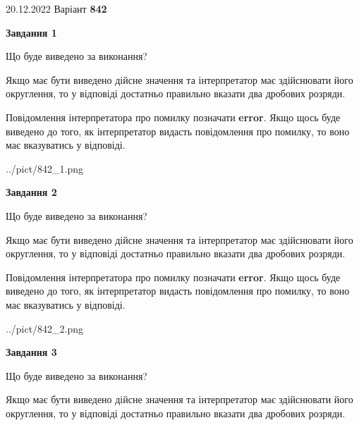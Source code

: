 \documentclass[12pt, ukrainian]{article}
\begin{document}
{20.12.2022 Варіант \No \textbf { 842 }\par}
{
\begin {Large}

{\begin {center}\textbf{Завдання 1}\end {center}}\par
Що буде виведено за виконання? \par

Якщо має бути виведено дійсне значення та інтерпретатор має здійснювати його округлення, 
то у відповіді достатньо правильно вказати два дробових розряди.

Повідомлення інтерпретатора про помилку позначати \textbf{error}.
Якщо щось буде виведено до того, як інтерпретатор видасть повідомлення про помилку, 
то воно має вказуватись у відповіді. \par

\begin{center}
	{../pict/842_1.png}
\end{center}
\newpage

{\begin {center}\textbf{Завдання 2}\end {center}}\par
Що буде виведено за виконання? \par

Якщо має бути виведено дійсне значення та інтерпретатор має здійснювати його округлення, 
то у відповіді достатньо правильно вказати два дробових розряди.

Повідомлення інтерпретатора про помилку позначати \textbf{error}.
Якщо щось буде виведено до того, як інтерпретатор видасть повідомлення про помилку, 
то воно має вказуватись у відповіді. \par

\begin{center}
	{../pict/842_2.png}
\end{center}
\newpage

{\begin {center}\textbf{Завдання 3}\end {center}}\par
Що буде виведено за виконання? \par

Якщо має бути виведено дійсне значення та інтерпретатор має здійснювати його округлення, 
то у відповіді достатньо правильно вказати два дробових розряди.


\end{Large}}
\end{document}

